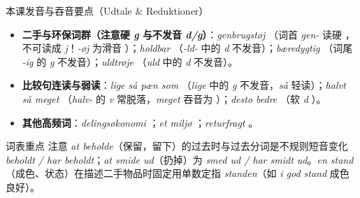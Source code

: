 \begin{tipbox}{本课发音与吞音要点（Udtale \& Reduktioner）}
\begin{itemize}
  \item \textbf{二手与环保词群（注意硬 \textit{g} 与不发音 \textit{d/g}）}：\textit{genbrugstøj} （词首 \textit{gen-} 读硬 ，不可读成 \textit{j}！\textit{-øj} 为滑音 ）；\textit{holdbar} （\textit{-ld-} 中的 \textit{d} 不发音）；\textit{bæredygtig} （词尾 \textit{-ig} 的 \textit{g} 不发音）；\textit{uldtrøje} （\textit{uld} 中的 \textit{d} 不发音）。
  \item \textbf{比较句连读与弱读}：\textit{lige så pæn som} （\textit{lige} 中的 \textit{g} 不发音，\textit{så} 轻读）；\textit{halvt så meget} （\textit{halv-} 的 \textit{v} 常脱落，\textit{meget} 吞音为 ）；\textit{desto bedre} （软 \textit{d} ）。
  \item \textbf{其他高频词}：\textit{delingsøkonomi} ；\textit{et miljø} ；\textit{returfragt} 。
\end{itemize}
\end{tipbox}


\begin{tipbox}{词表重点}
注意 \textit{at beholde}（保留，留下）的过去时与过去分词是不规则短音变化 \textit{beholdt / har beholdt}；\textit{at smide ud}（扔掉）为 \textit{smed ud / har smidt ud}。\textit{en stand}（成色、状态）在描述二手物品时固定用单数定指 \textit{standen}（如 \textit{i god stand} 成色良好）。
\end{tipbox}


